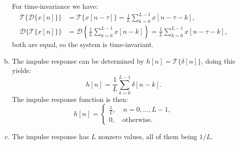 \begin{enumerate}
\begin{enumerate}[a)]
                For time-invariance we have:
                \begin{align*}
                  \mathcal{T}\{\mathcal{D}\{x[n]\}\} & =\mathcal{T}\{x[n-\tau]\}=\frac{1}{L}\sum_{k=0}^{L-1}x[n-\tau-k],                                    \\
                  \mathcal{D}\{\mathcal{T}\{x[n]\}\} & =\mathcal{D}\left\{\frac{1}{L}\sum_{k=0}^{L-1}x[n-k]\right\}=\frac{1}{L}\sum_{k=0}^{L-1}x[n-\tau-k],
                \end{align*}
                both are equal, so the system is time-invariant.

          \item The impulse response can be determined by $h[n]=\mathcal{T}\{\delta[n]\}$, doing this yields:
                \[ h[n]=\frac{1}{L}\sum_{k=0}^{L-1}\delta[n-k]. \]
                The impulse response function is then:
                \[ h[n]=\begin{cases}
                    \frac{1}{L}, \quad n=0,\hdots,L-1, \\
                    0, \quad \text{otherwise}.
                  \end{cases} \]

          \item The impulse response has $L$ nonzero values, all of them being $1/L$.


\end{enumerate}
\end{enumerate}
